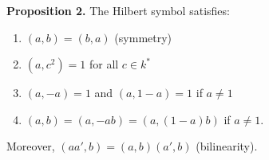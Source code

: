 \textbf{Proposition 2.} The Hilbert symbol satisfies:
\begin{enumerate}
\item[(i)] $(a, b) = (b, a)$ (symmetry)
\item[(ii)] $(a, c^2) = 1$ for all $c \in k^*$
\item[(iii)] $(a, -a) = 1$ and $(a, 1-a) = 1$ if $a \neq 1$
\item[(iv)] $(a, b) = (a, -ab) = (a, (1-a)b)$ if $a \neq 1$.
\end{enumerate}
Moreover, $(aa', b) = (a, b)(a', b)$ (bilinearity).
